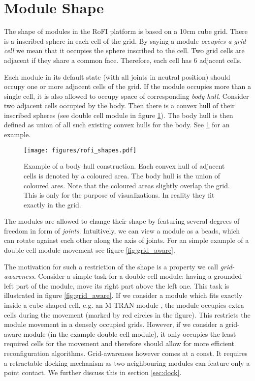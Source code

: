 \section{Module Shape}\label{sec:aware}

The shape of modules in the RoFI platform is based on a 10cm cube grid. There is
a inscribed sphere in each cell of the grid. By saying a module \emph{occupies a
grid cell} we mean that it occupies the sphere inscribed to the cell. Two grid
cells are adjacent if they share a common face. Therefore, each cell has 6
adjacent cells.

Each module in its default state (with all joints in neutral position) should
occupy one or more adjacent cells of the grid. If the module occupies more than
a single cell, it is also allowed to occupy space of corresponding \emph{body
hull}. Consider two adjacent cells occupied by the body. Then there is a convex
hull of their inscribed spheres (see double cell module in figure
\ref{fig:rofi_shapes}). The body hull is then defined as union of all such
existing convex hulls for the body. See \ref{fig:rofi_shapes} for an example.

\begin{figure}
    \centering
    \texttt{[image: figures/rofi\_shapes.pdf]}
    \caption{Example of a body hull construction. Each convex hull of adjacent
    cells is denoted by a coloured area. The body hull is the union of coloured
    ares. Note that the coloured areas slightly overlap the grid. This is only
    for the purpose of visualizations. In reality they fit exactly in the grid.}
    \label{fig:rofi_shapes}
\end{figure}

The modules are allowed to change their shape by featuring several degrees of
freedom in form of \emph{joints}. Intuitively, we can view a module as a beads,
which can rotate against each other along the axis of joints. For an simple
example of a double cell module movement see figure \ref{fig:grid_aware}.

The motivation for such a restriction of the shape is a property we call
\emph{grid-awareness}. Consider a simple task for a double cell module: having a
grounded left part of the module, move its right part above the left one. This
task is illustrated in figure \ref{fig:grid_aware}. If we consider a module
which fits exactly inside a cube-shaped cell, e.g. an M-TRAN module
\cite{haruhisa_kurokawa_m-tran_2003}, the module occupies extra cells during the
movement (marked by red circles in the figure). This restricts the module
movement in a densely occupied grids. However, if we consider a grid-aware
module (in the example double cell module), it only occupies the least required
cells for the movement and therefore should allow for more efficient
reconfiguration algorithms. Grid-awareness however comes at a const. It requires
a retractable docking mechanism as two neighbouring modules can feature only a
point contact. We further discuss this in section \ref{sec:dock}.

